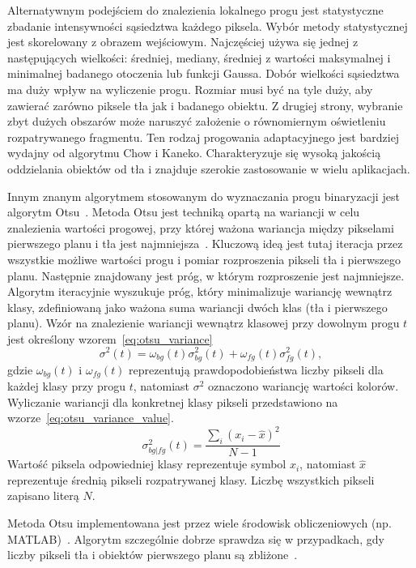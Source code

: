 Alternatywnym podejściem do znalezienia lokalnego progu jest statystyczne zbadanie intensywności sąsiedztwa każdego piksela.
Wybór metody statystycznej jest skorelowany z obrazem wejściowym.
Najczęściej używa się jednej z następujących wielkości: średniej, mediany, średniej z wartości maksymalnej i minimalnej badanego otoczenia lub funkcji Gaussa.
Dobór wielkości sąsiedztwa ma duży wpływ na wyliczenie progu.
Rozmiar musi być na tyle duży, aby zawierać zarówno piksele tła jak i badanego obiektu.
Z drugiej strony, wybranie zbyt dużych obszarów może naruszyć założenie o równomiernym oświetleniu rozpatrywanego fragmentu.
Ten rodzaj progowania adaptacyjnego jest bardziej wydajny od algorytmu Chow i Kaneko.
Charakteryzuje się wysoką jakością oddzielania obiektów od tła i znajduje szerokie zastosowanie w wielu aplikacjach.

Innym znanym algorytmem stosowanym do wyznaczania progu binaryzacji jest algorytm Otsu~\cite{4310076}.
Metoda Otsu jest techniką opartą na wariancji w celu znalezienia wartości progowej, przy której ważona wariancja między pikselami pierwszego planu i tła jest najmniejsza~\cite{otsu_article}.
Kluczową ideą jest tutaj iteracja przez wszystkie możliwe wartości progu i pomiar rozproszenia pikseli tła i pierwszego planu.
Następnie znajdowany jest próg, w którym rozproszenie jest najmniejsze.
Algorytm iteracyjnie wyszukuje próg, który minimalizuje wariancję wewnątrz klasy, zdefiniowaną jako ważona suma wariancji dwóch klas (tła i pierwszego planu).
Wzór na znalezienie wariancji wewnątrz klasowej przy dowolnym progu $t$ jest określony wzorem~\eqref{eq:otsu_variance}
\begin{equation}
    \label{eq:otsu_variance}
    \sigma^2(t)=\omega_{bg}(t)\sigma_{bg}^2(t)+\omega_{fg}(t)\sigma_{fg}^2(t),
\end{equation}
gdzie $\omega_{bg}(t)$ i $\omega_{fg}(t)$ reprezentują prawdopodobieństwa liczby pikseli dla każdej klasy przy progu $t$, natomiast $\sigma^2$ oznaczono wariancję wartości kolorów.
Wyliczanie wariancji dla konkretnej klasy pikseli przedstawiono na wzorze~\eqref{eq:otsu_variance_value}.
\begin{equation}
    \label{eq:otsu_variance_value}
    \sigma_{bg | fg}^2(t)=\dfrac{\sum_{i}^{}(x_i-\hat{x})^2}{N-1}
\end{equation}
Wartość piksela odpowiedniej klasy reprezentuje symbol $x_i$, natomiast $\hat{x}$ reprezentuje średnią pikseli rozpatrywanej klasy.
Liczbę wszystkich pikseli zapisano literą $N$.

Metoda Otsu implementowana jest przez wiele środowisk obliczeniowych (np. MATLAB)~\cite{otsu_inzynieria_rolnicza}.
Algorytm szczególnie dobrze sprawdza się w przypadkach, gdy liczby pikseli tła i obiektów pierwszego planu są zbliżone~\cite{10.1117/1.1631315}.

